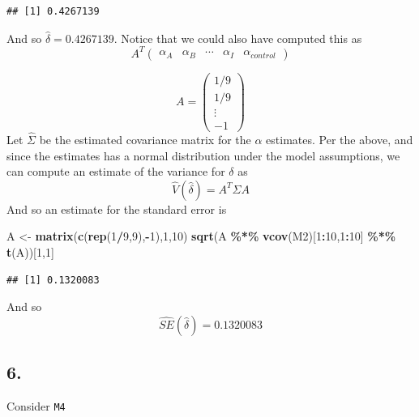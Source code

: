 \documentclass[
]{article}
\newenvironment{Shaded}{\begin{snugshade}}{\end{snugshade}}
\newcommand{\DecValTok}[1]{\textcolor[rgb]{0.00,0.00,0.81}{#1}}
\newcommand{\FunctionTok}[1]{\textcolor[rgb]{0.13,0.29,0.53}{\textbf{#1}}}
\newcommand{\NormalTok}[1]{#1}
\newcommand{\OtherTok}[1]{\textcolor[rgb]{0.56,0.35,0.01}{#1}}
\newcommand{\SpecialCharTok}[1]{\textcolor[rgb]{0.81,0.36,0.00}{\textbf{#1}}}
\begin{document}
\begin{verbatim}
## [1] 0.4267139
\end{verbatim}

And so \(\hat{\delta} = 0.4267139\). Notice that we could also have
computed this as \[
A^T \begin{pmatrix} \alpha_A & \alpha_B & \cdots &  \alpha_I  & \alpha_{control} \end{pmatrix}
\]

\[
A= \begin{pmatrix} 1/9 \\ 1/9  \\  \vdots \\  -1 \end{pmatrix}
\] Let \(\hat{\Sigma}\) be the estimated covariance matrix for the
\(\alpha\) estimates. Per the above, and since the estimates has a
normal distribution under the model assumptions, we can compute an
estimate of the variance for \(\delta\) as \[
\hat{V}(\hat{\delta}) = A^T \hat{\Sigma} A
\] And so an estimate for the standard error is

\begin{Shaded}
\begin{Highlighting}[]
\NormalTok{A }\OtherTok{\textless{}{-}} \FunctionTok{matrix}\NormalTok{(}\FunctionTok{c}\NormalTok{(}\FunctionTok{rep}\NormalTok{(}\DecValTok{1}\SpecialCharTok{/}\DecValTok{9}\NormalTok{,}\DecValTok{9}\NormalTok{),}\SpecialCharTok{{-}}\DecValTok{1}\NormalTok{),}\DecValTok{1}\NormalTok{,}\DecValTok{10}\NormalTok{)}
\FunctionTok{sqrt}\NormalTok{(A }\SpecialCharTok{\%*\%} \FunctionTok{vcov}\NormalTok{(M2)[}\DecValTok{1}\SpecialCharTok{:}\DecValTok{10}\NormalTok{,}\DecValTok{1}\SpecialCharTok{:}\DecValTok{10}\NormalTok{] }\SpecialCharTok{\%*\%} \FunctionTok{t}\NormalTok{(A))[}\DecValTok{1}\NormalTok{,}\DecValTok{1}\NormalTok{]}
\end{Highlighting}
\end{Shaded}

\begin{verbatim}
## [1] 0.1320083
\end{verbatim}

And so \[
\hat{SE}(\hat{\delta}) = 0.1320083
\]

\hypertarget{section-9}{%
\subsection{6.}\label{section-9}}

Consider \texttt{M4}
\end{document}
